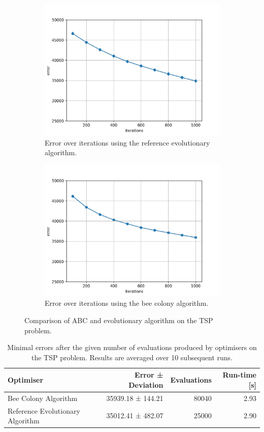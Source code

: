 \begin{figure}[h]
  \centering
  \begin{subfigure}{.5\textwidth}
    \centering
    \captionsetup{width=0.75\linewidth}
    \includegraphics[width=0.75\linewidth]{assets/reference_tsp.png}
    \caption{Error over iterations using the reference evolutionary algorithm.}
    \label{fig:reference_tsp}
  \end{subfigure}%
  \begin{subfigure}{.4\textwidth}
    \centering
    \captionsetup{width=0.75\linewidth}
    \includegraphics[width=0.75\linewidth]{assets/beecolony_tsp.png}
    \caption{Error over iterations using the bee colony algorithm.}
    \label{fig:becolony_tsp}
  \end{subfigure}
  \caption{Comparison of ABC and evolutionary algorithm on the TSP problem.}
  \label{fig:bee_vs_ea}
\end{figure}

\begin{table}[H]
  \centering
  \begin{tabular}{|l r r r|}
    \hline
    \textbf{Optimiser} & \textbf{Error ± Deviation} & \textbf{Evaluations} & \textbf{Run-time [s]} \\
    \hline
    Bee Colony Algorithm & 35939.18 ± 144.21 & 80040 & 2.93 \\
    Reference Evolutionary Algorithm & 35012.41 ± 482.07 & 25000 & 2.90 \\
    \hline
  \end{tabular}
  \caption{Minimal errors after the given number of evaluations produced by optimisers on the TSP problem. Results are averaged over 10 subsequent runs.}
  \label{tab:bee_vs_ea}
\end{table}

